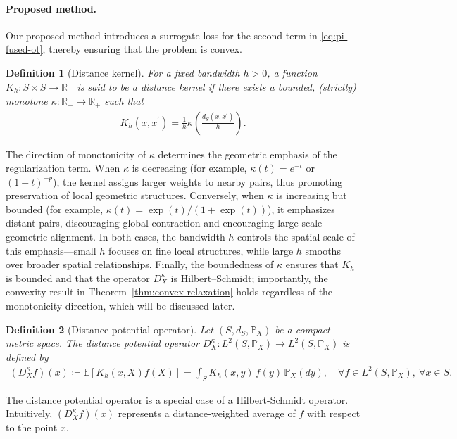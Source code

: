 \documentclass{article}
\newtheorem{definition}{Definition}
\begin{document}
\paragraph{Proposed method.} Our proposed method introduces a surrogate loss for the second term in \eqref{eq:pi-fused-ot}, thereby ensuring that the problem is convex.
\begin{definition}[Distance kernel]
	\label{def:kernel}
	For a fixed bandwidth $h > 0$, a function $K_h: S \times S \to \mathbb{R}_+$ is said to be a \emph{distance kernel} if there exists a bounded, (strictly) monotone $\kappa: \mathbb{R}_+ \to \mathbb{R}_+$ such that
	\begin{align*}
		K_h(x,x^\prime) = \frac{1}{h}\kappa\left(\frac{d_S(x,x^\prime)}{h}\right) .
	\end{align*}
\end{definition}
The direction of monotonicity of $\kappa$ determines the geometric emphasis of the regularization term. 
When $\kappa$ is decreasing (for example, $\kappa(t) = e^{-t}$ or $(1+t)^{-p}$), the kernel assigns larger weights to nearby pairs, thus promoting preservation of local geometric structures. 
Conversely, when $\kappa$ is increasing but bounded (for example, $\kappa(t)=\exp(t)/(1+\exp(t))$), it emphasizes distant pairs, discouraging global contraction and encouraging large-scale geometric alignment. 
In both cases, the bandwidth $h$ controls the spatial scale of this emphasis—small $h$ focuses on fine local structures, while large $h$ smooths over broader spatial relationships. 
Finally, the boundedness of $\kappa$ ensures that $K_h$ is bounded and that the operator $D_X^{\kappa}$ is Hilbert--Schmidt; importantly, the convexity result in Theorem~\ref{thm:convex-relaxation} holds regardless of the monotonicity direction, which will be discussed later.

\begin{definition}[Distance potential operator]
	\label{def:distance-potential}
	Let $(S,d_S,\mathbb{P}_X)$ be a compact metric space. The \emph{distance potential operator} $D_X^{\kappa} : L^2(S,\mathbb{P}_X) \to L^2(S,\mathbb{P}_X)$ is defined by
	\begin{align*}
		(D_X^{\kappa}f)(x) \coloneqq \mathbb{E}\left[K_h(x,X)f(X)\right] = \int_S K_h(x,y)\, f(y)\, \mathbb{P}_X(dy) , \quad \forall f \in L^2(S,\mathbb{P}_X),\ \forall x \in S .
	\end{align*}
\end{definition}
The distance potential operator is a special case of a Hilbert-Schmidt operator. Intuitively, $(D_X^{\kappa} f)(x)$ represents a distance-weighted average of $f$ with respect to the point $x$.
\end{document}
